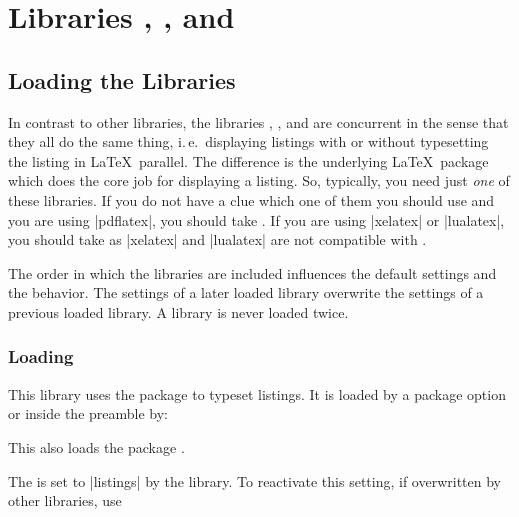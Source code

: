 \clearpage
\section{Libraries
  ,
  , and
  }\label{sec:listings}%
%

\subsection{Loading the Libraries}
In contrast to other  libraries, the libraries
, , and  are concurrent in the sense that
they all do the same thing, i.\,e.\ displaying listings with or without typesetting
the listing in \LaTeX\ parallel.
The difference is the underlying \LaTeX\ package which does the core job for
displaying a listing. So, typically, you need just \emph{one} of these
libraries. If you do not have a clue which one of them you should use
and you are using |pdflatex|, you should take .
If you are using |xelatex| or |lualatex|, you should take 
as |xelatex| and |lualatex| are not compatible with .

\begin{marker}
The order in which the libraries are included influences the default settings and
the  behavior. The settings of a later loaded library overwrite
the settings of a previous loaded library. A library is never loaded twice.
\end{marker}


\subsubsection{Loading }
This library uses the package  \cite{hoffmann:listings} to typeset
listings. It is loaded by a package option or inside the preamble by:
\begin{dispListing}
\end{dispListing}
This also loads the package  \cite{hoffmann:listings}.

The  is set to |listings| by the library.
To reactivate this setting, if overwritten by other libraries, use
\begin{dispListing}
\end{dispListing}

